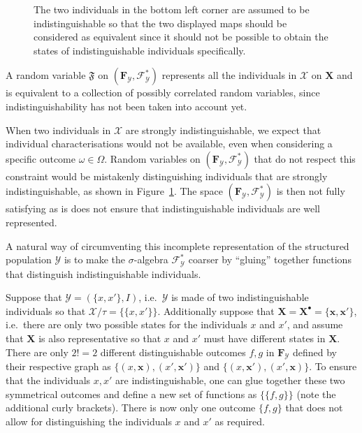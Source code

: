 \documentclass{aptpub}
\numberwithin{equation}{section}
\begin{document}
\begin{figure}
\centering

\scriptsize

\caption{The two individuals in the bottom left corner are assumed to be indistinguishable so that the two displayed maps should be considered as equivalent since it should not be possible to obtain the states of indistinguishable individuals specifically.}
\label{fig:mapping0}
\end{figure}

A random variable 
${\mathfrak{F}}$ on $({\mathbf{F}}_{\mathcal{Y}},{\mathcal{F}}^*_{\mathcal{Y}})$ represents all the individuals in ${\mathcal{X}}$ on ${\mathbf{X}}$ and is equivalent to a collection of possibly correlated random variables, since indistinguishability has not been taken into account yet.

When two individuals in ${\mathcal{X}}$ are strongly indistinguishable, we expect that individual characterisations would not be available, even when considering a specific outcome $\omega \in \Omega$. Random variables on $({\mathbf{F}}_{\mathcal{Y}},{\mathcal{F}}^*_{\mathcal{Y}})$ that do not respect this constraint would be mistakenly distinguishing individuals that are strongly indistinguishable, as shown in Figure~\ref{fig:mapping0}. The space $({\mathbf{F}}_{\mathcal{Y}},{\mathcal{F}}^*_{\mathcal{Y}})$ is then not fully satisfying as is does not ensure that indistinguishable individuals are well represented.

A natural way of circumventing this incomplete representation of the structured population ${\mathcal{Y}}$ is to make the $\sigma$-algebra ${\mathcal{F}}^*_{\mathcal{Y}}$ coarser by ``gluing'' together functions that distinguish indistinguishable individuals.

\begin{example}
\label{ex:gluing}
Suppose that ${\mathcal{Y}} = (\{x,x'\},I)$, i.e.\ ${\mathcal{Y}}$ is made of two indistinguishable individuals so that ${\mathcal{X}}/\tau = \{ \{x,x'\} \}$. Additionally suppose that ${\mathbf{X}} = {\mathbf{X}}^{\bullet} = \{{\mathbf{x}},{\mathbf{x}}'\}$, i.e.\ there are only two possible states for the individuals $x$ and $x'$, and assume that ${\mathbf{X}}$ is also representative so that $x$ and $x'$ must have different states in ${\mathbf{X}}$. There are only $2! = 2$ different distinguishable outcomes $f,g$ in ${\mathbf{F}}_{\mathcal{Y}}$ defined by their respective graph as $\{(x, {\mathbf{x}}), (x', {\mathbf{x}}')\}$ and $\{(x, {\mathbf{x}}'), (x', {\mathbf{x}})\}$. To ensure that the individuals $x,x'$ are indistinguishable, one can glue together these two symmetrical outcomes and define a new set of functions as $\{ \{ f,g \} \}$ (note the additional curly brackets). There is now only one outcome $\{f,g\}$ that does not allow for distinguishing the individuals $x$ and $x'$ as required.
\end{example}
\end{document}
